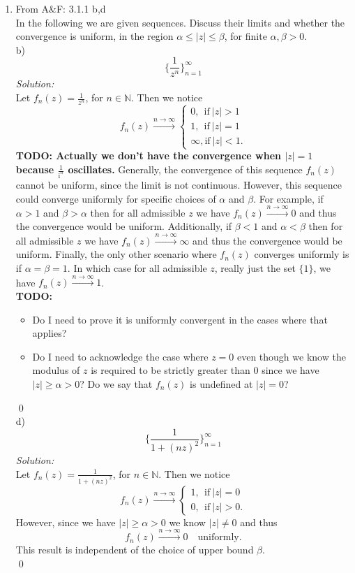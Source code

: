 \documentclass[10pt]{amsart}
\newcommand{\I}{\mathrm{i}}
\theoremstyle{nonumberplain}
\begin{document}
\begin{enumerate}[label={\bf {\arabic*}:}]
\item From A\&F: 3.1.1 b,d \\
In the following we are given sequences.
Discuss their limits and whether the convergence is uniform, in the region $\alpha \leq |z| \leq \beta$, for finite $\alpha, \beta > 0$. \\
b) $$ \bigg\{ \frac 1 {z^n} \bigg\}_{n=1}^{\infty} $$
\textit{Solution:}\\
Let $f_n(z) = \frac 1 {z^n}$, for $n \in \mathbb N$. Then we notice
$$
f_n(z) \overset{n \to \infty}{\longrightarrow} \begin{cases}
0, \: \: \text{if}\: |z| > 1 \\
1, \: \: \text{if}\: |z| = 1 \\
\infty, \text{if}\: |z| < 1.
\end{cases}
$$
\textbf{TODO: Actually we don't have the convergence when $|z| = 1$ because $\frac 1 {\I^n}$ oscillates.}
Generally, the convergence of this sequence $f_n(z)$ cannot be uniform, since the limit is not continuous.
However, this sequence could converge uniformly for specific choices of $\alpha$ and $\beta$.
For example, if $\alpha >1$ and $\beta > \alpha$ then for all admissible $z$ we have $f_n(z) \overset{n \to \infty}{\longrightarrow} 0$ and thus the convergence would be uniform.
Additionally, if $\beta < 1$ and $\alpha < \beta$ then for all admissible $z$ we have $f_n(z) \overset{n \to \infty}{\longrightarrow} \infty$ and thus the convergence would be uniform.
Finally, the only other scenario where $f_n(z)$ converges uniformly is if $\alpha = \beta = 1$.
In which case for all admissible $z$, really just the set $\{1\}$, we have $f_n(z) \overset{n \to \infty}{\longrightarrow} 1$. \\
\textbf{TODO:}
\begin{itemize}
\item Do I need to prove it is uniformly convergent in the cases where that applies?
\item Do I need to acknowledge the case where $z=0$ even though we know the modulus of $z$ is required to be strictly greater than $0$ since we have $|z| \geq \alpha > 0$?
Do we say that $f_n(z)$ is undefined at $|z| = 0$?
\end{itemize}
\qed \\

\noindent
d) $$ \bigg\{ \frac 1 {1 + (nz)^2} \bigg\}_{n=1}^{\infty} $$
\textit{Solution:}\\
Let $f_n(z) = \frac 1 {1 + (nz)^2}$, for $n \in \mathbb N$. Then we notice
$$
f_n(z) \overset{n \to \infty}{\longrightarrow} \begin{cases}
1, \: \: \text{if}\: |z| = 0 \\
0, \: \: \text{if}\: |z| > 0.
\end{cases}
$$
However, since we have $|z| \geq \alpha > 0$ we know $|z| \neq 0$ and thus
$$
f_n(z) \overset{n \to \infty}{\longrightarrow} 0 \quad \text{uniformly}.
$$
This result is independent of the choice of upper bound $\beta$. \\
\qed
\newpage


\end{enumerate}
\end{document}

